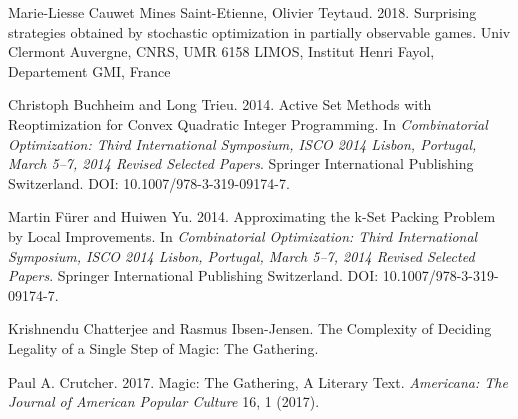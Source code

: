 \documentclass[12pt, letterpaper]{article}
\begin{document}
Marie-Liesse Cauwet Mines Saint-Etienne, Olivier Teytaud. 2018. Surprising strategies obtained by stochastic
optimization in partially observable games. Univ Clermont Auvergne, CNRS, UMR 6158 LIMOS, Institut Henri Fayol,
Departement GMI, France


Christoph Buchheim and Long Trieu. 2014.
Active Set Methods with Reoptimization for Convex Quadratic Integer Programming.
In \textit{Combinatorial Optimization: Third International Symposium,
ISCO 2014 Lisbon, Portugal, March 5–7, 2014 Revised Selected Papers}.
Springer International Publishing Switzerland.
DOI: 10.1007/978-3-319-09174-7.

Martin Fürer and Huiwen Yu. 2014.
Approximating the k-Set Packing Problem by Local Improvements.
In \textit{Combinatorial Optimization: Third International Symposium,
ISCO 2014 Lisbon, Portugal, March 5–7, 2014 Revised Selected Papers}.
Springer International Publishing Switzerland.
DOI: 10.1007/978-3-319-09174-7.


Krishnendu Chatterjee and Rasmus Ibsen-Jensen.
The Complexity of Deciding Legality of a Single Step of Magic: The Gathering.

Paul A. Crutcher. 2017. Magic: The Gathering, A Literary Text.
\textit{Americana: The Journal of American Popular Culture} 16, 1 (2017).
\end{document}
